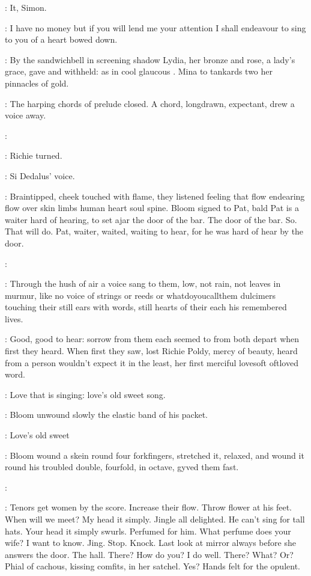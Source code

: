 \cowley:
It,
Simon.

\simon:
I have no money but if you will lend me your attention I shall endeavour
to sing to you of a heart bowed down.

:
By the sandwichbell
in screening shadow Lydia,
her bronze and rose,
a lady's grace,
gave and withheld:
as in cool glaucous
.
Mina to tankards two her pinnacles of gold.

:
The harping chords of prelude closed.
A chord,
longdrawn,
expectant,
drew a voice away.

\simon:

:
Richie turned.

\goulding:
Si Dedalus' voice.

:
Braintipped,
cheek touched with flame,
they listened feeling that flow
endearing flow over skin limbs human heart soul spine.
Bloom signed to
Pat,
bald Pat is a waiter hard of hearing,
to set ajar the door of the
bar.
The door of the bar.
So.
That will do.
Pat,
waiter,
waited,
waiting
to hear,
for he was hard of hear by the door.

\simon:

:
Through the hush of air a voice sang to them,
low,
not rain,
not leaves
in murmur,
like no voice of strings or reeds or whatdoyoucallthem
dulcimers touching their still ears with words,
still hearts of their each
his remembered lives.

\BloomInt:
Good,
good to hear:
sorrow from them each seemed to
from both depart when first they heard.
When first they saw,
lost Richie
Poldy,
mercy of beauty,
heard from a person wouldn't expect it in the least,
her first merciful
lovesoft oftloved word.

\BloomInt:
Love that is singing:
love's old sweet song.

:
Bloom unwound slowly
the elastic band of his packet.

\BloomInt:
Love's old sweet

:
Bloom
wound a skein round four forkfingers,
stretched it,
relaxed,
and wound it
round his troubled double,
fourfold,
in octave,
gyved them fast.

\simon:

\BloomInt:
Tenors get women by the score.
Increase their flow.
Throw flower at
his feet.
When will we meet?
My head it simply.
Jingle all delighted.
He
can't sing for tall hats.
Your head it simply swurls.
Perfumed for him.
What perfume does your wife?
I want to know.
Jing.
Stop.
Knock.
Last look
at mirror always before she answers the door.
The hall.
There?
How do you?
I do well.
There?
What?
Or?
Phial of cachous,
kissing comfits,
in her
satchel.
Yes?
Hands felt for the opulent.

